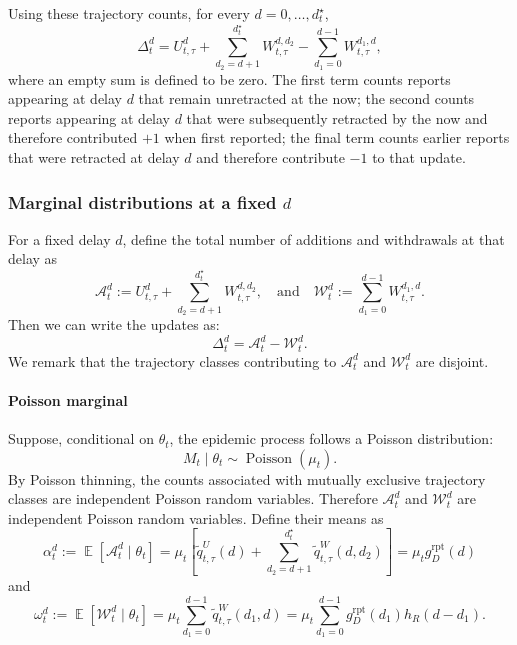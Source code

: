 \documentclass{article}
\theoremstyle{definition}
\theoremstyle{remark}
\newcommand{\Pois}{\operatorname{Poisson}}
\newcommand{\E}{\operatorname{\mathbb{E}}}
\begin{document}
Using these trajectory counts, for every $d=0,\dots,d_t^{\star}$,
\begin{equation}\label{deltadecomposition}
    \Delta_t^d
    =
    U_{t,\tau}^{d}
    +
    \sum_{d_2=d+1}^{d_t^{\star}}W_{t,\tau}^{d,d_2}
    -
    \sum_{d_1=0}^{d-1}W_{t,\tau}^{d_1,d},
\end{equation}
where an empty sum is defined to be zero. The first term counts reports appearing at delay $d$ that remain unretracted at the now; the second counts reports appearing at delay $d$ that were subsequently retracted by the now and therefore contributed $+1$ when first reported; the final term counts earlier reports that were retracted at delay $d$ and therefore contribute $-1$ to that update.

\subsubsection{Marginal distributions at a fixed $d$}

For a fixed delay $d$, define the total number of additions and withdrawals at that delay as
\begin{equation}\label{Adef}
    \mathcal A_t^d
    :=
    U_{t,\tau}^{d}
    +
    \sum_{d_2=d+1}^{d_t^{\star}}W_{t,\tau}^{d,d_2}, \quad
\text{and}\quad
    \mathcal W_t^d
    :=
    \sum_{d_1=0}^{d-1}W_{t,\tau}^{d_1,d}.
\end{equation}
Then we can write the updates as:
\begin{equation}\label{deltaAB}
    \Delta_t^d=\mathcal A_t^d-\mathcal W_t^d.
\end{equation}
We remark that the trajectory classes contributing to $\mathcal A_t^d$ and $\mathcal W_t^d$ are disjoint.

\paragraph{Poisson marginal}
Suppose, conditional on $\theta_t$, the epidemic process follows a Poisson distribution:
\begin{equation}
    M_t\mid\theta_t\sim\Pois(\mu_t).
\end{equation}
By Poisson thinning, the counts associated with mutually exclusive trajectory classes are independent Poisson random variables. Therefore $\mathcal A_t^d$ and $\mathcal W_t^d$ are independent Poisson random variables. Define their means as
\begin{equation}\label{alphadef}
    \alpha_t^d
    :=
    \E[\mathcal A_t^d\mid\theta_t]=
    \mu_t\left[
    \tilde q_{t,\tau}^{U}(d)
    +
    \sum_{d_2=d+1}^{d_t^{\star}}
    \tilde q_{t,\tau}^{W}(d,d_2)
    \right] = \mu_t g_D^{\mathrm{rpt}}(d)
\end{equation}
and 
\begin{equation}\label{omegadef}
    \omega_t^d
    :=
    \E[\mathcal W_t^d\mid\theta_t]
    =
    \mu_t
    \sum_{d_1=0}^{d-1}
    \tilde q_{t,\tau}^{W}(d_1,d)
    =
    \mu_t
    \sum_{d_1=0}^{d-1}
    g_D^{\mathrm{rpt}}(d_1)
    h_R(d-d_1).
\end{equation}
\end{document}
